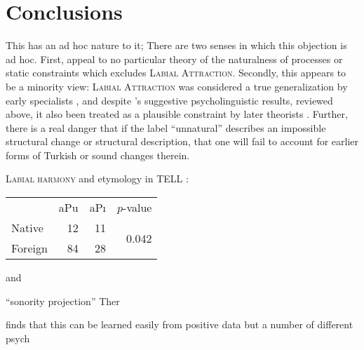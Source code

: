 \section{Conclusions}

\citet{Becker2011}

This has an ad hoc nature to it; 
There are two senses in which this objection is ad hoc. 
First, \citeauthor{Becker2011} appeal to no particular theory of the naturalness of processes or static constraints which excludes \textsc{Labial Attraction}. 
Secondly, this appears to be a minority view: \textsc{Labial Attraction} was considered a true generalization by early specialists
\citep[e.g.,][]{Lees1966a}, and despite \citeauthor{Zimmer1969}'s suggestive psycholinguistic results, reviewed above, it also been treated as a plausible constraint by later theorists \citep[e.g.,][]{NiChiosain1993,Ito1993,Ito1995a,Zuraw2000}.
Further, there is a real danger that if the label ``unnatural'' 
describes an impossible structural change or structural description, that one will fail to account for earlier forms of Turkish or sound changes therein.




 
\citet{Inkelas2001}

\begin{example}
\textsc{Labial harmony} and etymology in TELL \citep[][187]{Inkelas2001}: 

\vspace{0.5\baselineskip}
\begin{tabular}{l r r r}
        & aPu & aPı & $p$-value \\
Native  & 12  & 11  & \multirow{2}{*}{0.042} \\
Foreign & 84  & 28  \\
\end{tabular}
\end{example}

\citet{NiChiosain1993} and \citet{Ito1995b} 



``sonority projection''
Ther

\citet{Daland2011b} finds that this can be learned easily from positive data but a number of different psych
